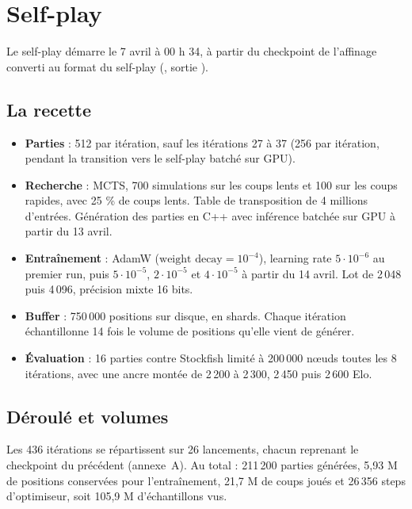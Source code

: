 \section{Self-play}

Le self-play démarre le 7 avril à 00 h 34, à partir du checkpoint de
l'affinage converti au format du self-play
(, sortie
).

\subsection{La recette}

\begin{itemize}[leftmargin=1.2em,itemsep=2pt,topsep=2pt]
  \item \textbf{Parties} : 512 par itération, sauf les itérations 27 à 37
        (256 par itération, pendant la transition vers le self-play batché
        sur GPU).
  \item \textbf{Recherche} : MCTS, 700 simulations sur les coups lents et
        100 sur les coups rapides, avec 25 \% de coups lents. Table de
        transposition de 4 millions d'entrées. Génération des parties en C++
        avec inférence batchée sur GPU à partir du 13 avril.
  \item \textbf{Entraînement} : AdamW ($\text{weight decay} = 10^{-4}$),
        learning rate $5 \cdot 10^{-6}$ au premier run, puis $5 \cdot 10^{-5}$,
        $2 \cdot 10^{-5}$ et $4 \cdot 10^{-5}$ à partir du 14 avril. Lot de
        2\,048 puis 4\,096, précision mixte 16 bits.
  \item \textbf{Buffer} : 750\,000 positions sur disque, en shards. Chaque
        itération échantillonne 14 fois le volume de positions qu'elle vient
        de générer.
  \item \textbf{Évaluation} : 16 parties contre Stockfish limité à
        200\,000 nœuds toutes les 8 itérations, avec une ancre montée de
        2\,200 à 2\,300, 2\,450 puis 2\,600 Elo.
\end{itemize}

\subsection{Déroulé et volumes}

Les 436 itérations se répartissent sur 26 lancements, chacun reprenant le
checkpoint du précédent (annexe~A). Au total : 211\,200 parties générées,
5,93 M de positions conservées pour l'entraînement, 21,7 M de coups joués et
26\,356 steps d'optimiseur, soit 105,9 M d'échantillons vus.

